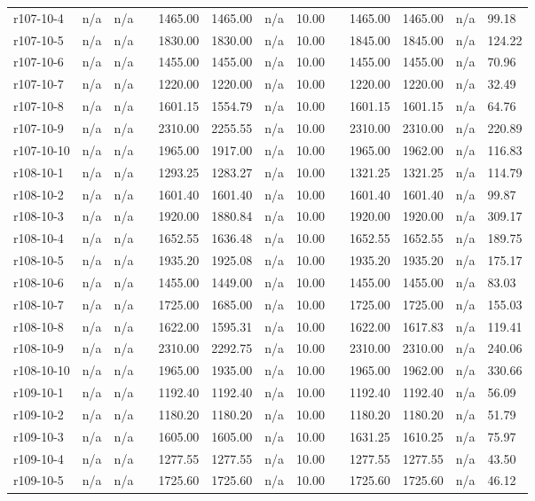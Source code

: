 \documentclass[final,5p,times,twocolumn]{elsarticle}
\begin{document}
{{{{{{{{{{{{{\begin{longtable}{l l l l l l l l l l l l l}
r107-10-4& n/a& n/a&&1465.00& 1465.00& n/a& 10.00&&1465.00& 1465.00& n/a& 99.18\\
r107-10-5& n/a& n/a&&1830.00& 1830.00& n/a& 10.00&&1845.00& 1845.00& n/a& 124.22\\
r107-10-6& n/a& n/a&&1455.00& 1455.00& n/a& 10.00&&1455.00& 1455.00& n/a& 70.96\\
r107-10-7& n/a& n/a&&1220.00& 1220.00& n/a& 10.00&&1220.00& 1220.00& n/a& 32.49\\
r107-10-8& n/a& n/a&&1601.15& 1554.79& n/a& 10.00&&1601.15& 1601.15& n/a& 64.76\\
r107-10-9& n/a& n/a&&2310.00& 2255.55& n/a& 10.00&&2310.00& 2310.00& n/a& 220.89\\
r107-10-10& n/a& n/a&&1965.00& 1917.00& n/a& 10.00&&1965.00& 1962.00& n/a& 116.83\\
r108-10-1& n/a& n/a&&1293.25& 1283.27& n/a& 10.00&&1321.25& 1321.25& n/a& 114.79\\
r108-10-2& n/a& n/a&&1601.40& 1601.40& n/a& 10.00&&1601.40& 1601.40& n/a& 99.87\\
r108-10-3& n/a& n/a&&1920.00& 1880.84& n/a& 10.00&&1920.00& 1920.00& n/a& 309.17\\
r108-10-4& n/a& n/a&&1652.55& 1636.48& n/a& 10.00&&1652.55& 1652.55& n/a& 189.75\\
r108-10-5& n/a& n/a&&1935.20& 1925.08& n/a& 10.00&&1935.20& 1935.20& n/a& 175.17\\
r108-10-6& n/a& n/a&&1455.00& 1449.00& n/a& 10.00&&1455.00& 1455.00& n/a& 83.03\\
r108-10-7& n/a& n/a&&1725.00& 1685.00& n/a& 10.00&&1725.00& 1725.00& n/a& 155.03\\
r108-10-8& n/a& n/a&&1622.00& 1595.31& n/a& 10.00&&1622.00& 1617.83& n/a& 119.41\\
r108-10-9& n/a& n/a&&2310.00& 2292.75& n/a& 10.00&&2310.00& 2310.00& n/a& 240.06\\
r108-10-10& n/a& n/a&&1965.00& 1935.00& n/a& 10.00&&1965.00& 1962.00& n/a& 330.66\\
r109-10-1& n/a& n/a&&1192.40& 1192.40& n/a& 10.00&&1192.40& 1192.40& n/a& 56.09\\
r109-10-2& n/a& n/a&&1180.20& 1180.20& n/a& 10.00&&1180.20& 1180.20& n/a& 51.79\\
r109-10-3& n/a& n/a&&1605.00& 1605.00& n/a& 10.00&&1631.25& 1610.25& n/a& 75.97\\
r109-10-4& n/a& n/a&&1277.55& 1277.55& n/a& 10.00&&1277.55& 1277.55& n/a& 43.50\\
r109-10-5& n/a& n/a&&1725.60& 1725.60& n/a& 10.00&&1725.60& 1725.60& n/a& 46.12\\

\end{longtable}}}}}}}}}}}}}}
\end{document}
